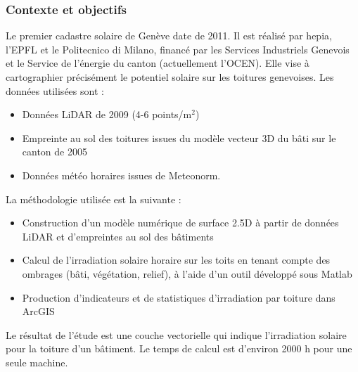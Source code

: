 \subsubsection{Contexte et objectifs}
\par{Le premier cadastre solaire de Genève \cite{desthieux_etude_2011} date de 2011. Il est réalisé par hepia, l'EPFL et le Politecnico di Milano, financé par les Services Industriels Genevois et le Service de l'énergie du canton (actuellement l'OCEN). Elle vise à cartographier précisément le potentiel solaire sur les toitures genevoises. Les données utilisées sont :
\begin{itemize}
    \item Données LiDAR de 2009 (4-6 points/m$^2$)
    \item Empreinte au sol des toitures issues du modèle vecteur 3D du bâti sur le canton de 2005
    \item Données météo horaires issues de Meteonorm.
\end{itemize}
La méthodologie utilisée est la suivante :
\begin{itemize}
    \item Construction d'un modèle numérique de surface 2.5D à partir de données LiDAR et d'empreintes au sol des bâtiments
    \item Calcul de l'irradiation solaire horaire sur les toits en tenant compte des ombrages (bâti, végétation, relief), à l'aide d'un outil développé sous Matlab
    \item Production d'indicateurs et de statistiques d'irradiation par toiture dans ArcGIS
\end{itemize}
\par{Le résultat de l'étude est une couche vectorielle qui indique l'irradiation solaire pour la toiture d'un bâtiment. Le temps de calcul est d'environ 2000 h pour une seule machine.}

}
